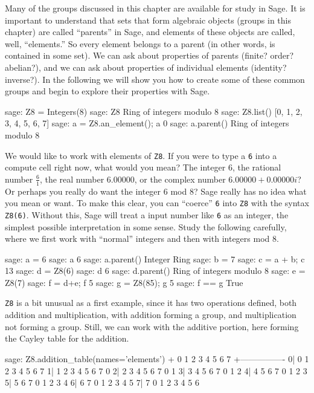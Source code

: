 Many of the groups discussed in this chapter are available for study in Sage.  It is important to understand that sets that form algebraic objects (groups in this chapter) are called ``parents'' in Sage, and elements of these objects are called, well, ``elements.''  So every element belongs to a parent (in other words, is contained in some set).  We can ask about properties of parents (finite? order? abelian?), and we can ask about properties of individual elements (identity? inverse?).  In the following we will show you how to create some of these common groups and begin to explore their properties with Sage.
%
%
\begin{sageexample}
sage: Z8 = Integers(8)
sage: Z8
Ring of integers modulo 8
sage: Z8.list()
[0, 1, 2, 3, 4, 5, 6, 7]
sage: a = Z8.an_element(); a
0
sage: a.parent()
Ring of integers modulo 8
\end{sageexample}
%
We would like to work with elements of \verb?Z8?.  If you were to type a \verb?6? into a compute cell right now, what would you mean?  The integer $6$, the rational number $\frac{6}{1}$, the real number $6.00000$, or the complex number $6.00000+0.00000i$?  Or perhaps you really do want the integer $6$ mod $8$?  Sage really has no idea what you mean or want.  To make this clear, you can ``coerce'' \verb?6? into \verb?Z8? with the syntax \verb?Z8(6)?.  Without this, Sage will treat a input number like \verb?6? as an integer, the simplest possible interpretation in some sense.  Study the following carefully, where we first work with ``normal'' integers and then with integers mod 8.
%
\begin{sageexample}
sage: a = 6
sage: a
6
sage: a.parent()
Integer Ring
sage: b = 7
sage: c = a + b; c
13
sage: d = Z8(6)
sage: d
6
sage: d.parent()
Ring of integers modulo 8
sage: e = Z8(7)
sage: f = d+e; f
5
sage: g = Z8(85); g
5
sage: f == g
True
\end{sageexample}
%
\verb?Z8? is a bit unusual as a first example, since it has two operations defined, both addition and multiplication, with addition forming a group, and multiplication not forming a group.  Still, we can work with the additive portion, here forming the Cayley table for the addition.
%
\begin{sageexample}
sage: Z8.addition_table(names='elements')
+  0 1 2 3 4 5 6 7
 +----------------
0| 0 1 2 3 4 5 6 7
1| 1 2 3 4 5 6 7 0
2| 2 3 4 5 6 7 0 1
3| 3 4 5 6 7 0 1 2
4| 4 5 6 7 0 1 2 3
5| 5 6 7 0 1 2 3 4
6| 6 7 0 1 2 3 4 5
7| 7 0 1 2 3 4 5 6
\end{sageexample}
